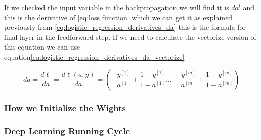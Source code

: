 If we checked the input variable in the backpropagation we will find it is $da^{l}$ and this is the derivative of \eqref{eq:loss function} which we can get it as explained previously from \eqref{eq:logistic_regression_derivatives_da} this is the formula for final layer in the feedforward step. If we need to calculate the vectorize version of this equation we can use equation\eqref{eq:logistic_regression_derivatives_da_vectorize}

 \begin{equation}\label{eq:logistic_regression_derivatives_da_vectorize}
      da =  \frac{d\ell}{da} = \frac{d\ell(a,y)}{da} = (- \frac{y^{[1]}}{a^{[1]}} + \frac{1-y^{[1]}}{1-a^{[1]}} \ldots - \frac{y^{[m]}}{a^{[m]}} + \frac{1-y^{[m]}}{1-a^{[m]}} )
  \end{equation}
   

\subsubsection{How we Initialize the Wights}
  
\subsubsection{Deep Learning Running Cycle}






